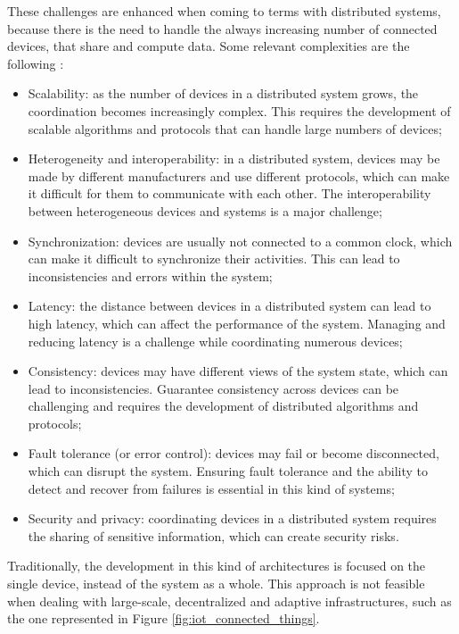 These challenges are enhanced when coming to terms with distributed systems, because there is the need to handle the always increasing number of connected devices, that share and compute data.\newline
Some relevant complexities are the following \cite{distributed_systems_challenges}:
\begin{itemize}
    \item Scalability: as the number of devices in a distributed system grows, the coordination becomes increasingly complex. This requires the development of scalable algorithms and protocols that can handle large numbers of devices;
    \item Heterogeneity and interoperability: in a distributed system, devices may be made by different manufacturers and use different protocols, which can make it difficult for them to communicate with each other. The interoperability between heterogeneous devices and systems is a major challenge;
    \item Synchronization: devices are usually not connected to a common clock, which can make it difficult to synchronize their activities. This can lead to inconsistencies and errors within the system;
    \item Latency: the distance between devices in a distributed system can lead to high latency, which can affect the performance of the system. Managing and reducing latency is a challenge while coordinating numerous devices;
    \item Consistency: devices may have different views of the system state, which can lead to inconsistencies. Guarantee consistency across devices can be challenging and requires the development of distributed algorithms and protocols;
    \item Fault tolerance (or error control): devices may fail or become disconnected, which can disrupt the system. Ensuring fault tolerance and the ability to detect and recover from failures is essential in this kind of systems;
    \item Security and privacy: coordinating devices in a distributed system requires the sharing of sensitive information, which can create security risks.
\end{itemize}

Traditionally, the development in this kind of architectures is focused on the single device, instead of the system as a whole. This approach is not feasible when dealing with large-scale, decentralized and adaptive infrastructures, such as the one represented in Figure \ref{fig:iot_connected_things}.


